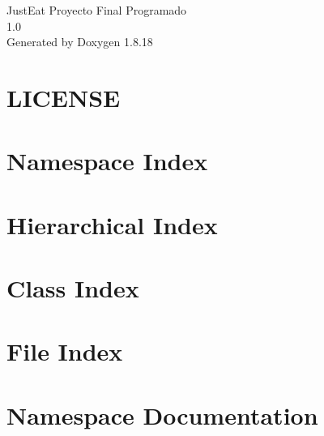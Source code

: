 \let\mypdfximage\pdfximage\def\pdfximage{\immediate\mypdfximage}\documentclass[twoside]{book}
\newcommand{\+}{\discretionary{\mbox{\scriptsize$\hookleftarrow$}}{}{}}
\newcommand{\clearemptydoublepage}{%
  \newpage{\pagestyle{empty}\cleardoublepage}%
}
\begin{document}
\hypersetup{pageanchor=false,
             bookmarksnumbered=true,
             pdfencoding=unicode
            }
\begin{titlepage}
\vspace*{7cm}
\begin{center}%
{\Large Just\+Eat Proyecto Final Programado \\[1ex]\large 1.\+0 }\\
\vspace*{1cm}
{\large Generated by Doxygen 1.8.18}\\
\end{center}
\end{titlepage}
\clearemptydoublepage
{}
\tableofcontents
\clearemptydoublepage
{}
\hypersetup{pageanchor=true}

\chapter{L\+I\+C\+E\+N\+SE}
\label{md__e_1__visual_proyectos__p_r_o_y_e_c_t_o_s__f_i_n_a_l_e_s__p_r_o_g_r_a_m_a_d_o_s__u_t_n__u_t_n879017a8c91d0ccbb05e95d8d27307f3}

\chapter{Namespace Index}

\chapter{Hierarchical Index}

\chapter{Class Index}

\chapter{File Index}

\chapter{Namespace Documentation}











\end{document}
